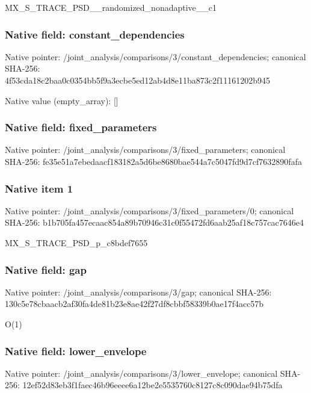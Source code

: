 \documentclass[10pt,a4paper]{article}
\begin{document}
\begingroup\raggedright\sloppy MX\_\allowbreak{}S\_\allowbreak{}TRACE\_\allowbreak{}PSD\_\allowbreak{}\_\allowbreak{}randomized\_\allowbreak{}nonadaptive\_\allowbreak{}\_\allowbreak{}c1\par\endgroup

\subsubsection{Native field: constant\_\allowbreak{}dependencies}
Native pointer: /joint\_\allowbreak{}analysis/comparisons/3/constant\_\allowbreak{}dependencies; canonical SHA-256: 4f53cda18c2baa0c0354bb5f9a3ecbe5ed12ab4d8e11ba873c2f11161202b945

Native value (empty\_\allowbreak{}array): []

\subsubsection{Native field: fixed\_\allowbreak{}parameters}
Native pointer: /joint\_\allowbreak{}analysis/comparisons/3/fixed\_\allowbreak{}parameters; canonical SHA-256: fe35e51a7ebedaacf183182a5d6be8680bae544a7c5047fd9d7cf7632890fafa

\subsubsection{Native item 1}
Native pointer: /joint\_\allowbreak{}analysis/comparisons/3/fixed\_\allowbreak{}parameters/0; canonical SHA-256: b1b705fa457ecaac854a89b70946c31c0f55472fd6aab25af18c757cac7646e4

\begingroup\raggedright\sloppy MX\_\allowbreak{}S\_\allowbreak{}TRACE\_\allowbreak{}PSD\_\allowbreak{}p\_\allowbreak{}c8bdef7655\par\endgroup

\subsubsection{Native field: gap}
Native pointer: /joint\_\allowbreak{}analysis/comparisons/3/gap; canonical SHA-256: 130c5e78cbaacb2af30fa4de81b23e8ae42f27df8cbbf58339b0ae17f4acc57b

\begingroup\raggedright\sloppy O(1)\par\endgroup

\subsubsection{Native field: lower\_\allowbreak{}envelope}
Native pointer: /joint\_\allowbreak{}analysis/comparisons/3/lower\_\allowbreak{}envelope; canonical SHA-256: 12ef52d83eb3f1faec46b96eeee6a12be2e5535760c8127c8c090dae94b75dfa
\end{document}
